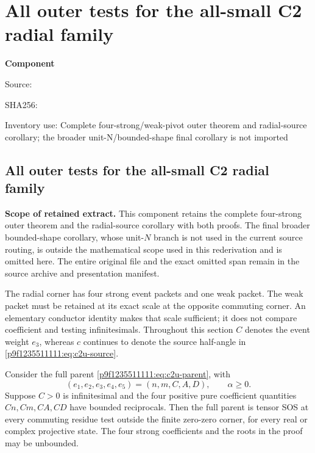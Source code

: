 \chapter{All outer tests for the all-small C2 radial family}
\label{component:pc7dacaa3258e}
\noindent\textbf{Component }\par
{\small\noindent Source: \par}
{\small\noindent SHA256: \par}
{\small\noindent Inventory use: Complete four-strong/weak-pivot outer theorem and radial-source corollary; the broader unit-N/bounded-shape final corollary is not imported\par}
\medskip
\section{All outer tests for the all-small C2 radial family}
\label{pc7dacaa3258e:sec:c2-radial-all-tests}

\noindent\textbf{Scope of retained extract.} This component retains the complete four-strong outer theorem and the radial-source corollary with both proofs. The final broader bounded-shape corollary, whose unit-$N$ branch is not used in the current source routing, is outside the mathematical scope used in this rederivation and is omitted here. The entire original file and the exact omitted span remain in the source archive and presentation manifest.


The radial corner has four strong event packets and one weak packet.
The weak packet must be retained at its exact scale at the opposite
commuting corner.  An elementary conductor identity makes that scale
sufficient; it does not compare coefficient and testing infinitesimals.
Throughout this section $C$ denotes the event weight $e_3$, whereas $c$
continues to denote the source half-angle in \eqref{p9f1235511111:eq:c2u-source}.

\begin{lemma}
\label{pc7dacaa3258e:lem:c2-four-strong-outer}
Consider the full parent \eqref{p9f1235511111:eq:c2u-parent}, with
\[
 (e_1,e_2,e_3,e_4,e_5)=(n,m,C,A,D),\qquad \alpha\geq0.
\]
Suppose $C>0$ is infinitesimal and the four positive pure coefficient
quantities $Cn,Cm,CA,CD$ have bounded reciprocals.  Then the full parent
is tensor SOS at every commuting residue test outside the finite
zero-zero corner, for every real or complex projective state.
The four strong coefficients and the roots in the proof may be unbounded.
\end{lemma}

